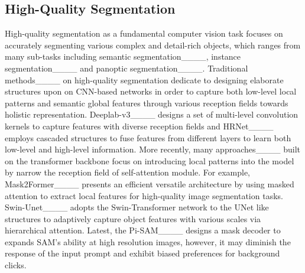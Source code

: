 \subsection{High-Quality Segmentation}
High-quality segmentation as a fundamental computer vision task focuses on accurately segmenting various complex and detail-rich objects, which ranges from many sub-tasks including semantic segmentation____, instance segmentation____ and panoptic segmentation____. 
Traditional methods____ on high-quality segmentation dedicate to designing elaborate structures upon on CNN-based networks in order to capture both low-level local patterns and semantic global features through various reception fields towards holistic representation.
Deeplab-v3____ designs a set of multi-level convolution kernels to capture features with diverse reception fields and HRNet____ employs cascaded structures to fuse features from different layers to learn both low-level and high-level information.
More recently, many approaches____ built on the transformer backbone focus on introducing local patterns into the model by narrow the reception field of self-attention module. For example, Mask2Former____ presents an efficient versatile architecture by using masked attention to extract local features for high-quality image segmentation tasks. Swin-Unet____ adopts the Swin-Transformer network to the UNet like structures to adaptively capture object features with various scales via hierarchical attention.
Latest, the Pi-SAM____ designs a mask decoder to expands SAM’s ability at high resolution images, however, it may diminish the response of the input prompt and exhibit biased preferences for background clicks. 
